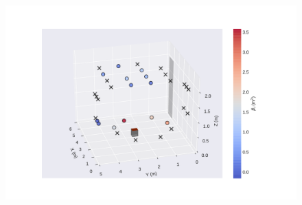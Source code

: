 \documentclass{article}
\begin{document}
\begin{figure}[htb] \centering
\includegraphics[width=.75\textwidth]{./figures/lasso_dfts.pdf}
\caption{}
\label{fig:lasso_dfts}
\end{figure}
\end{document}

